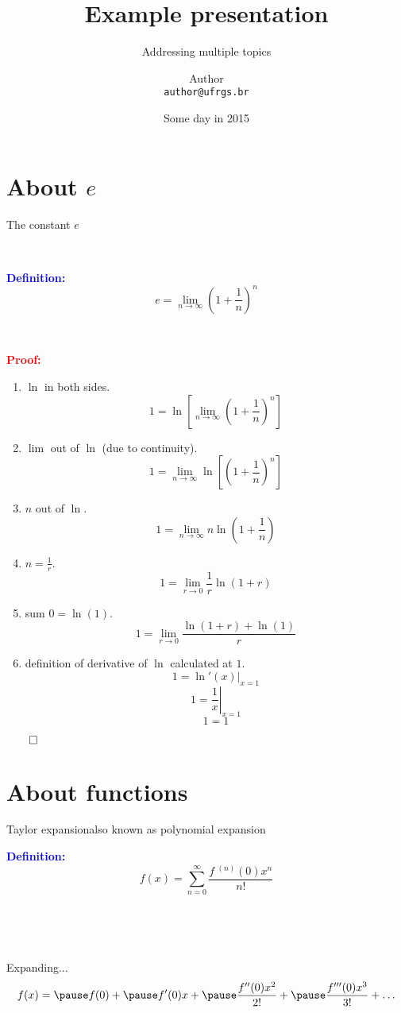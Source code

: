 \documentclass[xcolor=dvipsnames,pdf,10pt]{beamer}
\title     [Example presentation]      {Example presentation}
\subtitle                              {Addressing multiple topics}
\author    [Author]                    {Author\\ \texttt{author@ufrgs.br}}
\institute                             {\eatitle}
\date                                  {Some day in 2015}
\newcommand{\be}{\begin{enumerate}}
\newcommand{\ee}{\end{enumerate}}
\newcommand{\tm}{\item}
\newcommand{\defn}{\textcolor{blue}{\textbf{\textrm{Definition:\ }}}}
\newcommand{\prf}{\textcolor{Red}{\textbf{\textrm{Proof:\ }}}}
\begin{document}
\titlepageINF

\tableofcontentsINF

\section{About $e$} 

\begin{frame}[allowframebreaks]{The constant $e$}

\ 

\defn 
\[e =   \lim_{n \to \infty} \left(1 + \frac{1}{n}\right)^n \]


\ 

\prf 
\be
\tm $\ln$ in both sides.
  \[ 1 =   \ln \left[ \lim_{n \to \infty} \left(1 + \frac{1}{n}\right)^n \right] \]
\tm $\lim$ out of $\ln$ (due to continuity).
  \[ 1 =  \lim_{n \to \infty}  \ln \left[  \left(1 + \frac{1}{n}\right)^n \right] \]
\tm $n$ out of $\ln$.
  \[ 1 =  \lim_{n \to \infty}  n \ln \left(1 + \frac{1}{n}\right)  \]
\tm $n = \frac{1}{r}$.
  \[ 1 =  \lim_{r \to 0}  \frac{1}{r} \ln (1 + r) \]
\tm sum $0 = \ln(1)$.
  \[ 1 =  \lim_{r \to 0}  \frac{ \ln (1 + r) + \ln(1)}{r} \]
\tm definition of derivative of $\ln$ calculated at $1$.
 \[ 1 =  \left. \ln'(x)\right\vert_{x=1} \]
 \[ 1 =  \left. \frac{1}{x}\right\vert_{x=1} \]
 \[ 1 = 1 \]
\ee

\hfill $\qed$
\end{frame}


\section{About functions}


\begin{frame}{Taylor expansion}{also known as polynomial expansion}



\defn 
\[  f(x) = \sum_{n=0}^{\infty} \frac{f\ \!^{(n)}(0) x^n}{n!}   \]

\pause 

\ 

\ 

Expanding...
\[ f(x) = \pause f(0) + \pause f'(0)x + \pause \frac{f''(0)x^2}{2!} + \pause \frac{f'''(0)x^3}{3!} + \ldots \]
\end{frame}
\end{document}
